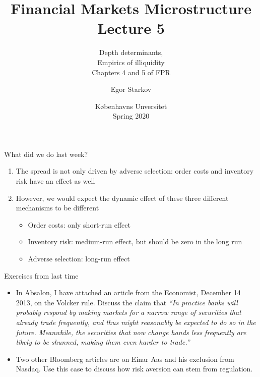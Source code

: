 \documentclass[english,10pt
,handout
]{beamer}
\title{Financial Markets Microstructure \\ Lecture 5}
\subtitle{Depth determinants, \\ Empirics of illiquidity\\
	Chapters 4 and 5 of FPR}
\author{Egor Starkov}
\date{K{\o}benhavns Unversitet \\
	Spring 2020}
\begin{document}
	

\frame[plain]{\titlepage}


\begin{frame}{What did we do last week?}
	\begin{enumerate}
		\item The spread is not only driven by adverse selection: order costs and inventory risk have an effect as well
		\item However, we would expect the dynamic effect of these three different mechanisms to be different
		\begin{itemize}
			\item Order costs: only short-run effect 
			\item Inventory risk: medium-run effect, but should be zero in the long run
			\item Adverse selection: long-run effect 
		\end{itemize}
	\end{enumerate}
\end{frame}


\begin{frame}{Exercises from last time}
	\begin{itemize}
		\item In Absalon, I have attached an article from the Economist, December 14 2013, on the Volcker rule. Discuss the claim that \emph{``In practice banks will probably respond by making markets for a narrow range of securities that already trade frequently, and thus might reasonably be expected to do so in the future. Meanwhile, the securities that now change hands less frequently are likely to be shunned, making them even harder to trade.''}
		\item Two other Bloomberg articles are on Einar Aas and his exclusion from Nasdaq. Use this case to discuss how risk aversion can stem from regulation.
	\end{itemize}
\end{frame}
\end{document}
